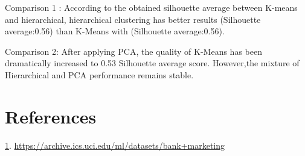 \documentclass[
  11pt,
]{article}
\begin{document}
Comparison 1 : According to the obtained silhouette average between
K-means and hierarchical, hierarchical clustering has better results
(Silhouette average:0.56) than K-Means with (Silhouette average:0.56).

Comparison 2: After applying PCA, the quality of K-Means has been
dramatically increased to 0.53 Silhouette average score. However,the
mixture of Hierarchical and PCA performance remains stable.

\newpage

\hypertarget{references}{%
\section{References}\label{references}}

\href{https://archive.ics.uci.edu/ml/datasets/bank+marketing}{1}.
\url{https://archive.ics.uci.edu/ml/datasets/bank+marketing}
\end{document}

